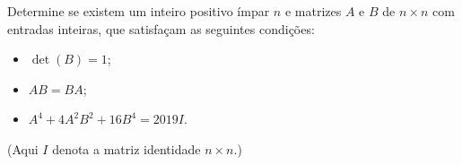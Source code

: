 Determine se existem um inteiro positivo ímpar \(n\) e matrizes \(A\) e \(B\) de \(n \times n\) com entradas inteiras, que satisfaçam as seguintes condições:
\begin{itemize}
	\item \(\det (B)=1\);
	\item \(AB=BA\);
	\item \(A^4+4A^2B^2+16B^4=2019I\).
\end{itemize}
(Aqui \(I\) denota a matriz identidade \(n\times n\).)
